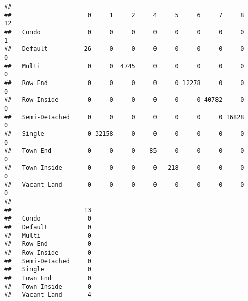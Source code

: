 \documentclass[]{article}
\newenvironment{Shaded}{\begin{snugshade}}{\end{snugshade}}
\newcommand{\KeywordTok}[1]{\textcolor[rgb]{0.13,0.29,0.53}{\textbf{#1}}}
\newcommand{\NormalTok}[1]{#1}
\newcommand{\OperatorTok}[1]{\textcolor[rgb]{0.81,0.36,0.00}{\textbf{#1}}}
\begin{document}
\begin{Shaded}
\end{Shaded}

\begin{verbatim}
##                
##                     0     1     2     4     5     6     7     8    12
##   Condo             0     0     0     0     0     0     0     0     1
##   Default          26     0     0     0     0     0     0     0     0
##   Multi             0     0  4745     0     0     0     0     0     0
##   Row End           0     0     0     0     0 12278     0     0     0
##   Row Inside        0     0     0     0     0     0 40782     0     0
##   Semi-Detached     0     0     0     0     0     0     0 16828     0
##   Single            0 32158     0     0     0     0     0     0     0
##   Town End          0     0     0    85     0     0     0     0     0
##   Town Inside       0     0     0     0   218     0     0     0     0
##   Vacant Land       0     0     0     0     0     0     0     0     0
##                
##                    13
##   Condo             0
##   Default           0
##   Multi             0
##   Row End           0
##   Row Inside        0
##   Semi-Detached     0
##   Single            0
##   Town End          0
##   Town Inside       0
##   Vacant Land       4
\end{verbatim}

\begin{Shaded}
\end{Shaded}
\end{document}
